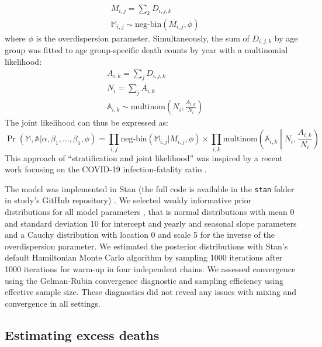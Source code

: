 \documentclass{article}
\begin{document}
	\begin{align}
		&M_{i,j} = \sum_k D_{i,j,k} \\
		&\mathds{M}_{i,j} \sim \text{neg-bin}\left(M_{i,j},\phi\right)
	\end{align}
	where $\phi$ is the overdispersion parameter.
	Simultaneously, the sum of $D_{i,j,k}$ by age group was fitted to age group-specific death counts by year with a multinomial likelihood:
	\begin{align}
		&A_{i,k} = \sum_j D_{i,j,k} \\
		&N_i = \sum_j A_{i,k} \\
		&\mathds{A}_{i,k} \sim \text{multinom}\left(N_i, \frac{A_{i,k}}{N_i}\right)
	\end{align}
	The joint likelihood can thus be expressed as:
	\begin{equation}
		\Pr(\mathds{M},\mathds{A} | \alpha, \beta_1, \ldots, \beta_5,\phi) = \prod_{i,j} \text{neg-bin}\left(\mathds{M}_{i,j} | M_{i,j},\phi\right) \times \prod_{i,k} \text{multinom}\left(\mathds{A}_{i,k} \middle| N_i, \frac{A_{i,k}}{N_i}\right)
	\end{equation}
	This approach of ``stratification and joint likelihood'' was inspired by a recent work focusing on the COVID-19 infection-fatality ratio \cite{hauser2020}.
	
	The model was implemented in Stan (the full code is available in the \texttt{stan} folder in study's GitHub repository) \cite{carpenter2017}. We selected weakly informative prior distributions for all model parameters \cite{gelman2020regression,gelman2008weakly}, that is normal distributions with mean 0 and standard deviation 10 for intercept and yearly and seasonal slope parameters and a Cauchy distribution with location 0 and scale 5 for the inverse of the overdispersion parameter. We estimated the posterior distributions with Stan's default Hamiltonian Monte Carlo algorithm \cite{hoffman2014no} by sampling 1000 iterations after 1000 iterations for warm-up in four independent chains. We assessed convergence using the Gelman-Rubin convergence diagnostic and sampling efficiency using effective sample size. These diagnostics did not reveal any issues with mixing and convergence in all settings.
	
	\subsection{Estimating excess deaths}
	
\end{document}
